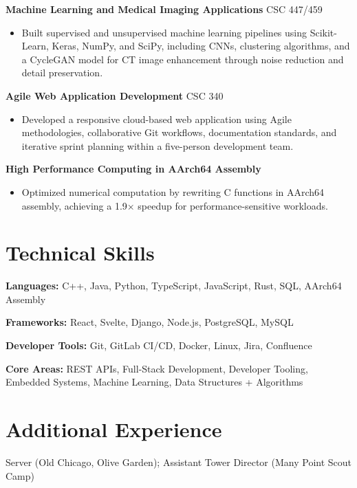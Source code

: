 \documentclass[10pt]{article}
\begin{document}
\textbf{Machine Learning and Medical Imaging Applications}
\hfill CSC 447/459

\begin{itemize}

\item Built supervised and unsupervised machine learning pipelines using Scikit-Learn, Keras, NumPy, and SciPy, including CNNs, clustering algorithms, and a CycleGAN model for CT image enhancement through noise reduction and detail preservation.

\end{itemize}


\textbf{Agile Web Application Development}
\hfill CSC 340

\begin{itemize}

\item Developed a responsive cloud-based web application using Agile methodologies, collaborative Git workflows, documentation standards, and iterative sprint planning within a five-person development team.

\end{itemize}


\textbf{High Performance Computing in AArch64 Assembly}

\begin{itemize}
\item Optimized numerical computation by rewriting C functions in AArch64 assembly, achieving a 1.9$\times$ speedup for performance-sensitive workloads.
\end{itemize}
\vspace{-7pt}


\section*{Technical Skills}

\textbf{Languages:} C++, Java, Python, TypeScript, JavaScript, Rust, SQL, AArch64 Assembly

\textbf{Frameworks:} React, Svelte, Django, Node.js, PostgreSQL, MySQL


\textbf{Developer Tools:} Git, GitLab CI/CD, Docker, Linux, Jira, Confluence

\textbf{Core Areas:} REST APIs, Full-Stack Development, Developer Tooling, Embedded Systems, Machine Learning, Data Structures + Algorithms
\vspace{-7pt}



\section*{Additional Experience}

Server (Old Chicago, Olive Garden); Assistant Tower Director (Many Point Scout Camp)

\vspace{-7pt}
\end{document}
